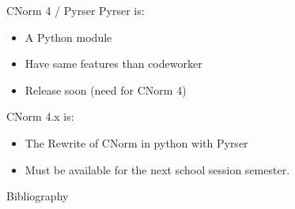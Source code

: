 \documentclass[xcolor={usenames,svgnames}]{beamer}
\begin{document}
\begin{frame}{CNorm 4 / Pyrser}
Pyrser is:
\begin{itemize}
\item A Python module
\item Have same features than codeworker
\item Release soon (need for CNorm 4)
\end{itemize}
CNorm 4.x is:
\begin{itemize}
\item The Rewrite of CNorm in python with Pyrser
\item Must be available for the next school session semester.
\end{itemize}
\end{frame}

\begin{frame}{Bibliography}
\rtxbibliography
\end{frame}
\end{document}
